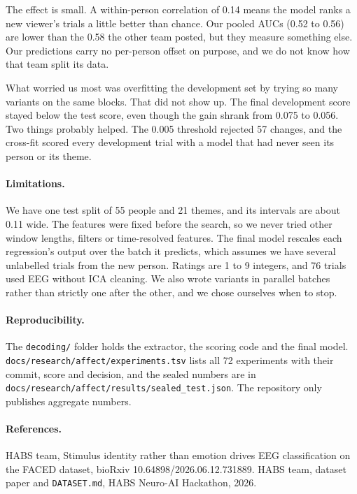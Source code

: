 \documentclass[10pt]{article}
\begin{document}
The effect is small. A within-person correlation of 0.14 means the model ranks
a new viewer's trials a little better than chance. Our pooled AUCs (0.52 to
0.56) are lower than the 0.58 the other team posted, but they measure something
else. Our predictions carry no per-person offset on purpose, and we do not know
how that team split its data.

What worried us most was overfitting the development set by trying so many
variants on the same blocks. That did not show up. The final development score
stayed below the test score, even though the gain shrank from 0.075 to 0.056.
Two things probably helped. The 0.005 threshold rejected 57 changes, and the
cross-fit scored every development trial with a model that had never seen its
person or its theme.

\paragraph{Limitations.} We have one test split of 55 people and 21 themes, and
its intervals are about 0.11 wide. The features were fixed before the search,
so we never tried other window lengths, filters or time-resolved features. The
final model rescales each regression's output over the batch it predicts,
which assumes we have several unlabelled trials from the new person. Ratings
are 1 to 9 integers, and 76 trials used EEG without ICA cleaning. We also wrote
variants in parallel batches rather than strictly one after the other, and we
chose ourselves when to stop.

\paragraph{Reproducibility.} The \texttt{decoding/} folder holds the
extractor, the scoring code and the final model.
\nolinkurl{docs/research/affect/experiments.tsv} lists all 72 experiments with
their commit, score and decision, and the sealed numbers are in
\nolinkurl{docs/research/affect/results/sealed_test.json}. The repository only
publishes aggregate numbers.

\paragraph{References.} HABS team, Stimulus identity rather than emotion drives
EEG classification on the FACED dataset, bioRxiv 10.64898/2026.06.12.731889.
HABS team, dataset paper and \texttt{DATASET.md}, HABS Neuro-AI Hackathon, 2026.
\end{document}
